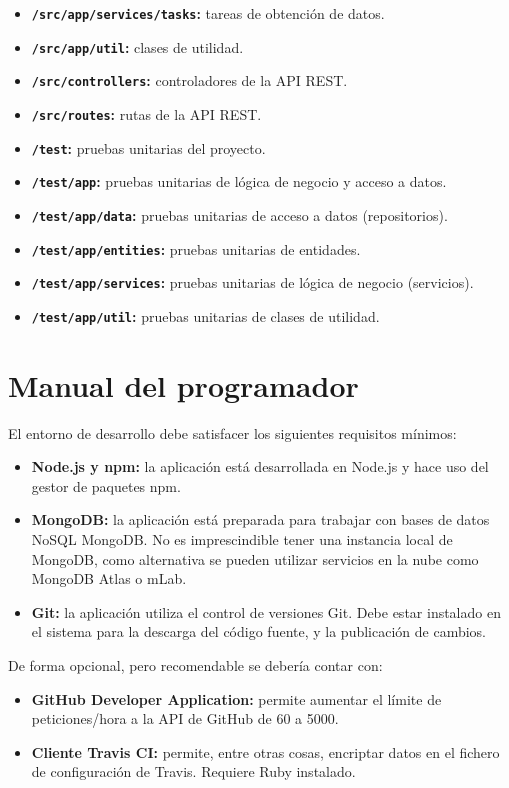 \begin{itemize}
	\item \textbf{\texttt{/src/app/services/tasks}:} tareas de obtención de datos.
	\item \textbf{\texttt{/src/app/util}:} clases de utilidad.
	\item \textbf{\texttt{/src/controllers}:} controladores de la API REST.
	\item \textbf{\texttt{/src/routes}:} rutas de la API REST.
	\item \textbf{\texttt{/test}:} pruebas unitarias del proyecto.
	\item \textbf{\texttt{/test/app}:} pruebas unitarias de lógica de negocio y acceso a datos.
	\item \textbf{\texttt{/test/app/data}:} pruebas unitarias de acceso a datos (repositorios).
	\item \textbf{\texttt{/test/app/entities}:} pruebas unitarias de entidades.
	\item \textbf{\texttt{/test/app/services}:} pruebas unitarias de lógica de negocio (servicios).
	\item \textbf{\texttt{/test/app/util}:} pruebas unitarias de clases de utilidad.
\end{itemize}

\section{Manual del programador}

El entorno de desarrollo debe satisfacer los siguientes requisitos mínimos:

\begin{itemize}
	\item \textbf{Node.js y npm:} la aplicación está desarrollada en Node.js y hace uso del gestor de paquetes npm.
	\item \textbf{MongoDB:} la aplicación está preparada para trabajar con bases de datos NoSQL MongoDB. No es imprescindible tener una instancia local de MongoDB, como alternativa se pueden utilizar servicios en la nube como MongoDB Atlas o mLab.
	\item \textbf{Git:} la aplicación utiliza el control de versiones Git. Debe estar instalado en el sistema para la descarga del código fuente, y la publicación de cambios.
\end{itemize}

De forma opcional, pero recomendable se debería contar con:

\begin{itemize}
	\item \textbf{GitHub Developer Application:} permite aumentar el límite de peticiones/hora a la API de GitHub de 60 a 5000.
	\item \textbf{Cliente Travis CI:} permite, entre otras cosas, encriptar datos en el fichero de configuración de Travis. Requiere Ruby instalado.
\end{itemize}

